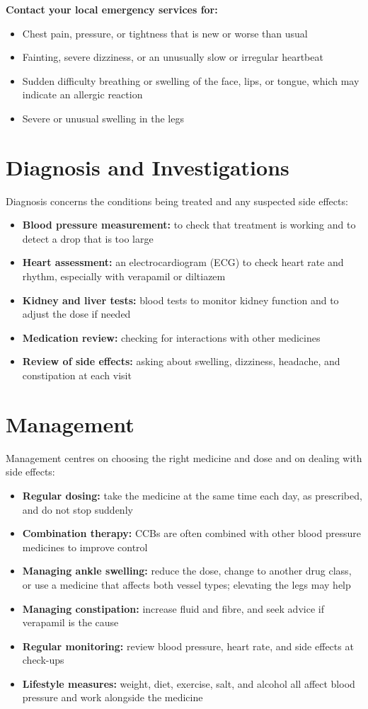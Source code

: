 \textbf{Contact your local emergency services for:}
\begin{itemize}
    \item Chest pain, pressure, or tightness that is new or worse than usual
    \item Fainting, severe dizziness, or an unusually slow or irregular heartbeat
    \item Sudden difficulty breathing or swelling of the face, lips, or tongue, which may indicate an allergic reaction
    \item Severe or unusual swelling in the legs
\end{itemize}

\section*{Diagnosis and Investigations}
Diagnosis concerns the conditions being treated and any suspected side effects:
\begin{itemize}
    \item \textbf{Blood pressure measurement:} to check that treatment is working and to detect a drop that is too large
    \item \textbf{Heart assessment:} an electrocardiogram (ECG) to check heart rate and rhythm, especially with verapamil or diltiazem
    \item \textbf{Kidney and liver tests:} blood tests to monitor kidney function and to adjust the dose if needed
    \item \textbf{Medication review:} checking for interactions with other medicines
    \item \textbf{Review of side effects:} asking about swelling, dizziness, headache, and constipation at each visit
\end{itemize}

\section*{Management}
Management centres on choosing the right medicine and dose and on dealing with side effects:
\begin{itemize}
    \item \textbf{Regular dosing:} take the medicine at the same time each day, as prescribed, and do not stop suddenly
    \item \textbf{Combination therapy:} CCBs are often combined with other blood pressure medicines to improve control
    \item \textbf{Managing ankle swelling:} reduce the dose, change to another drug class, or use a medicine that affects both vessel types; elevating the legs may help
    \item \textbf{Managing constipation:} increase fluid and fibre, and seek advice if verapamil is the cause
    \item \textbf{Regular monitoring:} review blood pressure, heart rate, and side effects at check-ups
    \item \textbf{Lifestyle measures:} weight, diet, exercise, salt, and alcohol all affect blood pressure and work alongside the medicine
\end{itemize}

